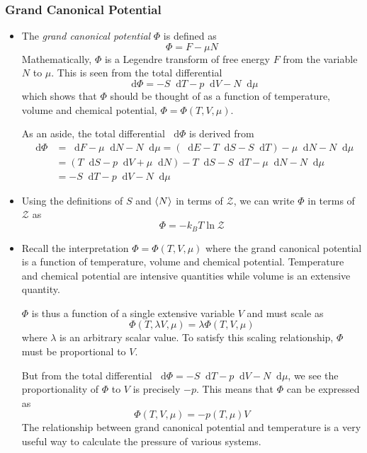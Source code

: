 \documentclass[11pt, a4paper]{article}
\newcommand{\diff}{\mathop{}\!\mathrm{d}} %
\begin{document}
\subsubsection{Grand Canonical Potential}
\begin{itemize}
	\item The \textit{grand canonical potential} $ \Phi $ is defined as
	\begin{equation*}
		\Phi = F - \mu N
	\end{equation*}
	Mathematically, $ \Phi $ is a Legendre transform of free energy $ F $ from the variable $ N $ to $ \mu $. This is seen from the total differential 
	\begin{equation*}
		\diff \Phi = -S \diff T - p \diff V - N\diff \mu	
	\end{equation*}
	which shows that $ \Phi $ should be thought of as a function of temperature, volume and chemical potential, $ \Phi = \Phi(T, V, \mu) $.
	
	As an aside, the total differential $ \diff \Phi  $ is derived from
	\begin{align*}
		\diff \Phi &= \diff F - \mu \diff N - N \diff \mu = (\diff E - T \diff S - S \diff T) - \mu \diff N - N \diff \mu\\
		&=(T \diff S - p\diff V + \mu \diff N) - T \diff S - S \diff T - \mu \diff N - N \diff \mu\\
		&=-S \diff T - p \diff V - N\diff \mu
	\end{align*}
	
	\item Using the definitions of $ S $ and $ \expval{N} $ in terms of $ \mathcal{Z} $, we can write $ \Phi $ in terms of $ \mathcal{Z} $ as
	\begin{equation*}
		\Phi = - k_{B}T \ln \mathcal{Z}
	\end{equation*}
	
	\item Recall the interpretation $ \Phi = \Phi(T, V, \mu) $ where the grand canonical potential is a function of temperature, volume and chemical potential. Temperature and chemical potential are intensive quantities while volume is an extensive quantity.
	
	 $ \Phi $ is thus a function of a single extensive variable $ V $ and must scale as 
	 \begin{equation*}
	 	\Phi(T, \lambda V, \mu) = \lambda \Phi(T, V, \mu)
	 \end{equation*}
	 where $ \lambda $ is an arbitrary scalar value. To satisfy this scaling relationship, $ \Phi $ must be proportional to $ V $. 
	 
	 But from the total differential $ \diff \Phi = -S \diff T - p \diff V - N\diff \mu $, we see the proportionality of $ \Phi $ to $ V $ is precisely $ - p $. This means that $ \Phi $ can be expressed as
	 \begin{equation*}
	 	\Phi(T, V, \mu) = -p(T, \mu) V
	 \end{equation*}
	 The relationship between grand canonical potential and temperature is a very useful way to calculate the pressure of various systems.

\end{itemize}
\end{document}

